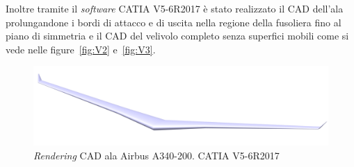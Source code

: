 %
%
%
%

Inoltre tramite il \emph{software} CATIA V5-6R2017 è stato realizzato il CAD dell'ala prolungandone i bordi di attacco e di uscita nella regione della fusoliera fino al piano di simmetria e il CAD del velivolo completo senza superfici mobili come si vede nelle figure~\vref{fig:V2} e~\vref{fig:V3}. 
\begin {figure} [h!]
\centering
\includegraphics[width= \textwidth ]{images/fileImg/Parte_3-Aerodinamica_Velivolo_A340-200/CadAlaAirbusA340-200.png}
\caption{\footnotesize \emph{Rendering} CAD ala Airbus A340-200. CATIA V5-6R2017}
\label {fig:V2}
\end {figure}

